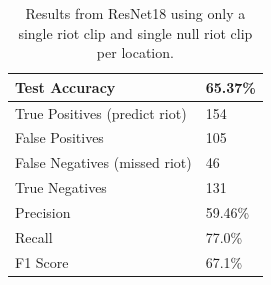 

\begin{table}
    \centering
    \begin{tabular}{|l|l|}
        \hline
        \textbf{Test Accuracy}  & \textbf{65.37\%} \\
        \hline
        True Positives (predict riot) & 154 \\
        \hline
        False Positives & 105 \\
        \hline
        False Negatives (missed riot) & 46 \\
        \hline
        True Negatives & 131 \\
        \hline
        \hline
        Precision & 59.46\% \\
        \hline
        Recall & 77.0\% \\
        \hline
        F1 Score & 67.1\%  \\
        \hline
    \end{tabular}
    \caption{Results from ResNet18 using only a single riot clip and single null riot clip per location.}
    \label{tab:singleloc_results_table}
\end{table}

